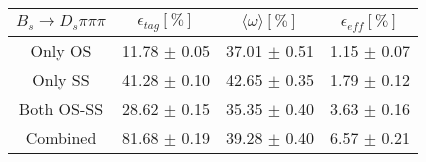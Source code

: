 \begin{tabular}{c c c c}
\hline
\hline
$ B_s \to D_s \pi \pi \pi$ & $\epsilon_{tag} [\%]$ & $\langle \omega \rangle [\%] $ & $\epsilon_{eff} [\%]$ \\
\hline
Only OS & 11.78 $\pm$ 0.05 & 37.01 $\pm$ 0.51 & 1.15 $\pm$ 0.07\\
Only SS & 41.28 $\pm$ 0.10 & 42.65 $\pm$ 0.35 & 1.79 $\pm$ 0.12\\
Both OS-SS & 28.62 $\pm$ 0.15 & 35.35 $\pm$ 0.40 & 3.63 $\pm$ 0.16\\
\hline
Combined & 81.68 $\pm$ 0.19 & 39.28 $\pm$ 0.40 & 6.57 $\pm$ 0.21\\
\hline
\hline
\end{tabular}
